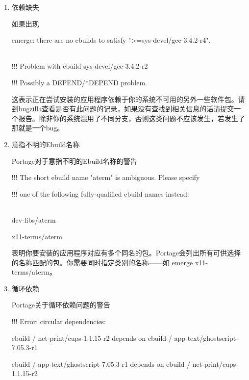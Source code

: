 \begin{enumerate}
\item 依赖缺失

如果出现

\begin{code}
emerge: there are no ebuilds to satisfy ">=sys-devel/gcc-3.4.2-r4".

\qquad\\

!!! Problem with ebuild sys-devel/gcc-3.4.2-r2

!!! Possibly a DEPEND/*DEPEND problem. 

\end{code}

这表示正在尝试安装的应用程序依赖于你的系统不可用的另外一些软件包。请到bugzilla查看是否有此问题的记录，如果没有查找到相关信息的话请提交一个报告。除非你的系统混用了不同分支，否则这类问题不应该发生，若发生了那就是一个bug。

\item 意指不明的Ebuild名称

\begin{example}{Portage对于意指不明的Ebuild名称的警告}
\begin{code}
!!! The short ebuild name "aterm" is ambiguous.  Please specify

!!! one of the following fully-qualified ebuild names instead:

~ \\

    dev-libs/aterm

    x11-terms/aterm

\end{code}

\end{example}

表明你要安装的应用程序对应有多个同名的包。Portage会列出所有可供选择的名称匹配的包。你需要同时指定类别的名称——如 emerge x11-terms/aterm。


\item 循环依赖

\begin{example}{Portage关于循环依赖问题的警告}
\begin{code}
!!! Error: circular dependencies: 

ebuild / net-print/cups-1.1.15-r2 depends on ebuild / app-text/ghostscript-7.05.3-r1

ebuild / app-text/ghostscript-7.05.3-r1 depends on ebuild / net-print/cups-1.1.15-r2 
\end{code}
\end{example}


\end{enumerate}
